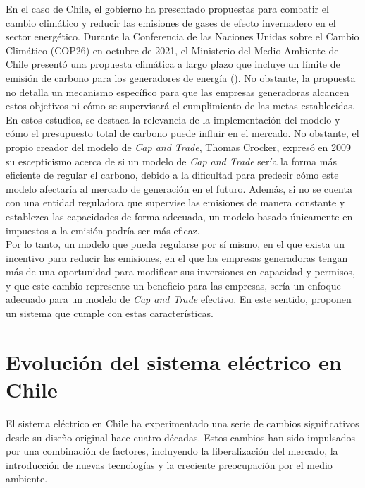 En el caso de Chile, el gobierno ha presentado propuestas para combatir el cambio climático y reducir las emisiones de gases de efecto invernadero en el sector energético. Durante la Conferencia de las Naciones Unidas sobre el Cambio Climático (COP26) en octubre de 2021, el Ministerio del Medio Ambiente de Chile presentó una propuesta climática a largo plazo que incluye un límite de emisión de carbono para los generadores de energía (). No obstante, la propuesta no detalla un mecanismo específico para que las empresas generadoras alcancen estos objetivos ni cómo se supervisará el cumplimiento de las metas establecidas.\\

En estos estudios, se destaca la relevancia de la implementación del modelo y cómo el presupuesto total de carbono puede influir en el mercado. No obstante, el propio creador del modelo de \textit{Cap and Trade}, Thomas Crocker, expresó en 2009 su escepticismo acerca de si un modelo de \textit{Cap and Trade} sería la forma más eficiente de regular el carbono, debido a la dificultad para predecir cómo este modelo afectaría al mercado de generación en el futuro. Además, si no se cuenta con una entidad reguladora que supervise las emisiones de manera constante y establezca las capacidades de forma adecuada, un modelo basado únicamente en impuestos a la emisión podría ser más eficaz.\\

Por lo tanto, un modelo que pueda regularse por sí mismo, en el que exista un incentivo para reducir las emisiones, en el que las empresas generadoras tengan más de una oportunidad para modificar sus inversiones en capacidad y permisos, y que este cambio represente un beneficio para las empresas, sería un enfoque adecuado para un modelo de \textit{Cap and Trade} efectivo. En este sentido,  proponen un sistema que cumple con estas características.

\section{Evolución del sistema eléctrico en Chile}\label{c22}

El sistema eléctrico en Chile ha experimentado una serie de cambios significativos desde su diseño original hace cuatro décadas. Estos cambios han sido impulsados por una combinación de factores, incluyendo la liberalización del mercado, la introducción de nuevas tecnologías y la creciente preocupación por el medio ambiente.\\


